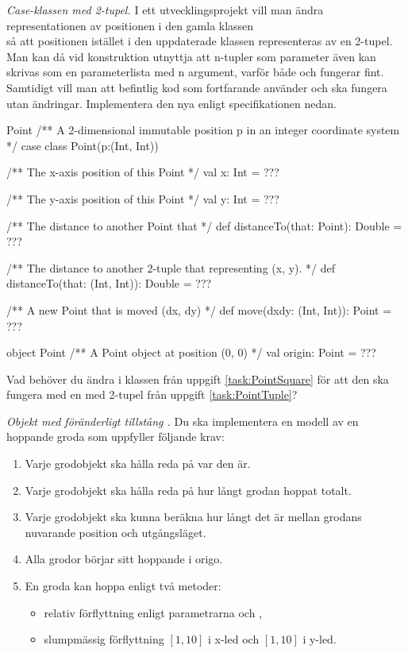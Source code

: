 \Task \label{task:PointTuple} \emph{Case-klassen  med 2-tupel.} I ett utvecklingsprojekt vill man ändra representationen av positionen i den gamla klassen  \\  så att positionen istället i den uppdaterade klassen representeras av en 2-tupel. Man kan då vid konstruktion utnyttja att n-tupler som parameter även kan skrivas som en parameterlista med n argument, varför både  och  fungerar fint. Samtidigt vill man att befintlig kod som fortfarande använder  och  ska fungera utan ändringar.  Implementera den nya  enligt specifikationen nedan. 
\begin{ScalaSpec}{Point}
/** A 2-dimensional immutable position p in an integer coordinate system */ 
case class Point(p:(Int, Int)) {
  /** The x-axis position of this Point */
  val x: Int = ???

  /** The y-axis position of this Point */
  val y: Int = ???

  /** The distance to another Point that */
  def distanceTo(that: Point): Double = ???

  /** The distance to another 2-tuple that representing (x, y). */
  def distanceTo(that: (Int, Int)): Double = ???

  /** A new Point that is moved (dx, dy) */
  def move(dxdy: (Int, Int)): Point = ???
}

object Point {
  /** A Point object at position (0, 0) */ 
  val origin: Point = ???
}
\end{ScalaSpec}

\Task\Pen Vad behöver du ändra i klassen  från uppgift \ref{task:PointSquare} för att den ska fungera med en  med 2-tupel från uppgift \ref{task:PointTuple}?

\Task \emph{Objekt med föränderligt tillstång .} Du ska implementera en modell av en hoppande groda som uppfyller följande krav: 
\begin{enumerate}
\item Varje grodobjekt ska hålla reda på var den är.
\item Varje grodobjekt ska hålla reda på hur långt grodan hoppat totalt.
\item Varje grodobjekt ska kunna beräkna hur långt det är mellan grodans nuvarande position och utgångsläget.
\item Alla grodor börjar sitt hoppande i origo.
\item En groda kan hoppa enligt två metoder: 
  \begin{itemize} [nolistsep, noitemsep]
  \item relativ förflyttning enligt parametrarna  och ,  
  \item slumpmässig förflyttning $[1, 10]$ i x-led och $[1, 10]$ i y-led. 
  \end{itemize}
\end{enumerate}

